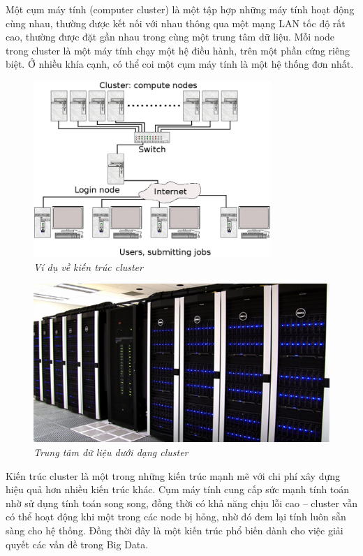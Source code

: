 \documentclass[12pt]{report}
\begin{document}
Một cụm máy tính (computer cluster) là một tập hợp những máy tính hoạt động cùng nhau, thường được kết nối với nhau thông qua một mạng LAN tốc độ rất cao, thường được đặt gần nhau trong cùng một trung tâm dữ liệu. Mỗi node trong cluster là một máy tính chạy một hệ điều hành, trên một phần cứng riêng biệt. Ở nhiều khía cạnh, có thể coi một cụm máy tính là một hệ thống đơn nhất. 

\begin{figure}[H]
\centering
\includegraphics[width=9cm]{cluster.png}
\caption{\it Ví dụ về kiến trúc cluster}
\end{figure}

\begin{figure}[H]
\centering
\includegraphics[width=\textwidth]{cluster.jpg}
\caption{\it Trung tâm dữ liệu dưới dạng cluster}
\end{figure}

Kiến trúc cluster là một trong những kiến trúc mạnh mẽ với chi phí xây dựng hiệu quả hơn nhiều kiến trúc khác. Cụm máy tính cung cấp sức mạnh tính toán nhờ sử dụng tính toán song song, đồng thời có khả năng chịu lỗi cao – cluster vẫn có thể hoạt động khi một trong các node bị hỏng, nhờ đó đem lại tính luôn sẵn sàng cho hệ thống. Đồng thời đây là một kiến trúc phổ biến dành cho việc giải quyết các vấn đề trong Big Data.
\end{document}
